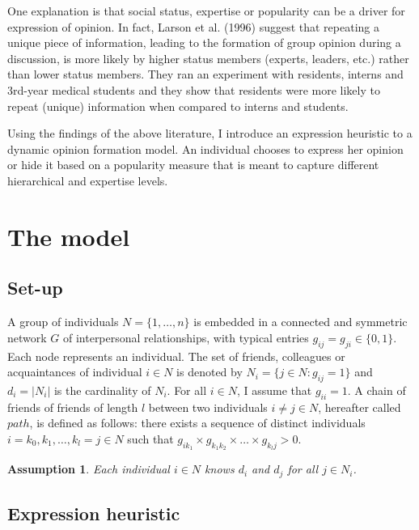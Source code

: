 \documentclass{article}
\newtheorem{assumption}{Assumption}
\begin{document}
One explanation is that social status, expertise or popularity can be a driver for expression of opinion. In fact, Larson et al. (1996)\cite{larson} suggest that repeating a unique piece of information, leading to the formation of group opinion during a discussion, is more likely by higher status members (experts, leaders, etc.) rather than lower status members. They ran an experiment with residents, interns and 3rd-year medical students and they show that residents were more likely to repeat (unique) information when compared to interns and students.

Using the findings of the above literature, I introduce an expression heuristic to a dynamic opinion formation model. An individual chooses to express her opinion or hide it based on a  popularity measure that is meant to capture different hierarchical and expertise levels. 



\section{The model} \label{themodel}

\subsection{Set-up} \label{setup}
A group of individuals $N=\{1, \ldots , n\}$ is embedded in a connected and symmetric network $G$ of interpersonal relationships, with typical entries $g_{ij} = g_{ji}  \in \{ 0,1\}$. Each node represents an individual. The set of friends, colleagues or acquaintances of individual $i \in N$ is denoted by $N_i = \{j \in N : g_{ij}=1 \}$ and $d_i = |N_i|$ is the cardinality of $N_i$. For all $i \in N$, I assume that $g_{ii} =1$. A chain of friends of friends of length $l$ between two individuals $i \neq j \in N$, hereafter called  $path$,  is defined as follows: there exists a sequence of distinct individuals $i=k_0, k_1, \ldots, k_l = j \in N$ such that $g_{ik_1} \times g_{k_1 k_2} \times \ldots \times g_{k_l j} > 0$.

\begin{assumption}
Each individual $i \in N$ knows $d_i$ and $d_j$ for all $j \in N_i$.
\end{assumption}

\subsection{Expression heuristic}
\end{document}
